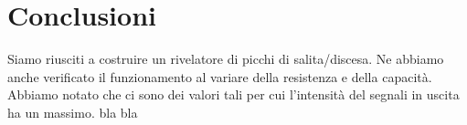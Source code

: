 \section{Conclusioni}

Siamo riusciti a costruire un rivelatore di picchi di salita/discesa. Ne abbiamo anche verificato il funzionamento al variare della resistenza e della capacità. Abbiamo notato che ci sono dei valori tali per cui l'intensità del segnali in uscita ha un massimo. bla bla